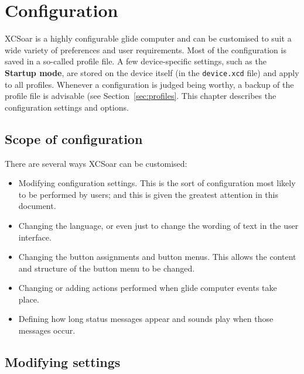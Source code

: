 \chapter{Configuration}\label{cha:configuration}\label{conf:configuration}
XCSoar is a highly configurable glide computer and can be customised
to suit a wide variety of preferences and user requirements. Most of the
configuration is saved in a so-called profile file.  A few
device-specific settings, such as the {\bf Startup mode}, are stored on
the device itself (in the \texttt{device.xcd} file) and apply to all
profiles. Whenever a configuration is judged being worthy, a
backup of the profile file is advisable (see Section~\ref{sec:profiles}. This
chapter describes the configuration settings and options.

\section{Scope of configuration}

There are several ways XCSoar can be customised:
\begin{itemize}

\item Modifying configuration settings.  This is the sort of configuration
  most likely to be performed by users; and this is given the greatest attention 
  in this document.
\item Changing the language, or even just to change the wording
  of text in the user interface.
\item Changing the button assignments and button menus.  This allows 
  the content and structure of the button menu to be changed. 
\item Changing or adding actions performed when glide computer events
  take place.
\item Defining how long status messages appear and sounds play
  when those messages occur.
\end{itemize}

\section{Modifying settings}

